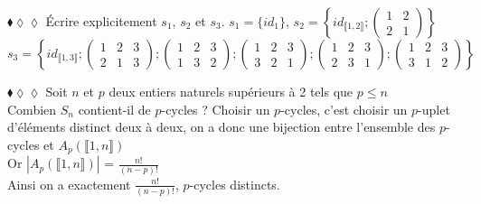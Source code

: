 \documentclass[11pt]{article}
\begin{document}
\begin{exercice}{$\blacklozenge\lozenge\lozenge$}{}
    Écrire explicitement $s_{1}$, $s_{2}$ et $s_{3}$.
    \tcblower
    $s_{1} = \{ id_{1} \}$, $s_{2} = \left\{ id_{\llbracket 1, 2 \rrbracket}; 
    \begin{pmatrix}
        1 & 2 \\
        2 & 1 
    \end{pmatrix}
    \right\}$ \\
    $s_{3} = \left\{ id_{\llbracket 1, 3 \rrbracket}; 
    \begin{pmatrix}
        1 & 2 & 3\\
        2 & 1 & 3
    \end{pmatrix};
    \begin{pmatrix}
        1 & 2 & 3\\
        1 & 3 & 2
    \end{pmatrix};
    \begin{pmatrix}
        1 & 2 & 3\\
        3 & 2 & 1
    \end{pmatrix};
    \begin{pmatrix}
        1 & 2 & 3\\
        2 & 3 & 1
    \end{pmatrix};
    \begin{pmatrix}
        1 & 2 & 3\\
        3 & 1 & 2
    \end{pmatrix}
    \right\}$ 
\end{exercice}

\vspace*{0.4cm}

\begin{exercice}{$\blacklozenge\lozenge\lozenge$}{}
    Soit $n$ et $p$ deux entiers naturels supérieurs à 2 tels que $p \leq n$\\
    Combien $S_{n}$ contient-il de $p$-cycles ?
    \tcblower
    Choisir un $p$-cycles, c'est choisir un $p$-uplet d'éléments distinct deux à deux, on a donc une bijection entre l'ensemble des $p$-cycles et $A_{p}(\llbracket 1, n \rrbracket)$\\
    Or $|A_{p}(\llbracket 1, n \rrbracket)|$ = $\frac{n!}{(n-p)!}$\\
    Ainsi on a exactement $\frac{n!}{(n-p)!}$, $p$-cycles distincts.
\end{exercice}

\pagebreak
\end{document}
